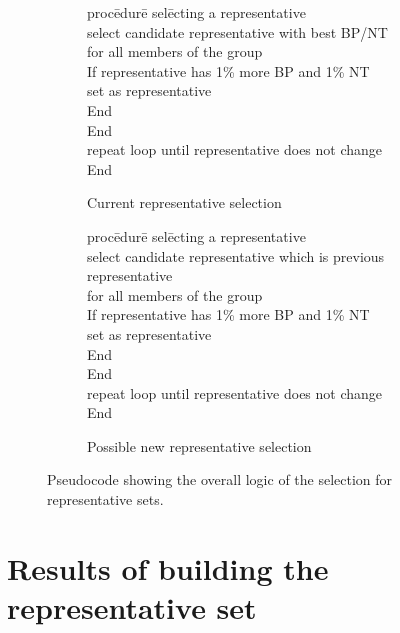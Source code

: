 \begin{figure}
  \begin{subfigure}[b]{0.5\textwidth}
    \begin{tabbing}
      proc\=edur\=e sel\=ecting a representative \\
      \>select candidate representative with best BP/NT \\
      \>for all members of the group \\
        \>\>If representative has 1\% more BP and 1\% NT \\
          \>\>\>set as representative \\
          \>\>End \\
        \>End \\
      \>repeat loop until representative does not change \\
      End
    \end{tabbing}
    \caption{Current representative selection}
\label{fig:pseudocode-cur-representatives}
  \end{subfigure}
  \begin{subfigure}[b]{0.5\textwidth}
    \begin{tabbing}
      proc\=edur\=e sel\=ecting a representative \\
      \>select candidate representative which is previous representative \\
      \>for all members of the group \\
        \>\>If representative has 1\% more BP and 1\% NT \\
          \>\>\>set as representative \\
          \>\>End \\
        \>End \\
      \>repeat loop until representative does not change \\
      End
    \end{tabbing}
    \caption{Possible new representative selection}
\label{fig:pseudocode-new-representatives}
  \end{subfigure}
  \caption{Pseudocode showing the overall logic of the selection for
  representative sets.}
\label{fig:pseudocode-representatives}
\end{figure}

\section{Results of building the representative set}

